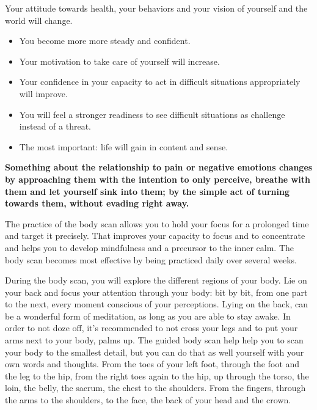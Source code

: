 \documentclass[../main.tex]{subfiles}
\begin{document}
\label{Ex:BodyScan}

Your attitude towards health,  your behaviors
and your vision of yourself and the world will change.

\begin{itemize}
\item You become more more {steady and confident}.
\item Your motivation to {take care of yourself} will increase.
\item Your confidence in your capacity to {act in difficult situations appropriately} will improve.
\item You will feel a stronger readiness to {see difficult situations as challenge} instead of a threat.
\item The most important: {life will gain in content and sense}.
\end{itemize} 

\textbf{Something about the {relationship to pain or negative emotions changes} by approaching them with the intention to {only perceive}, {breathe} with them and let yourself {sink into them};
  by the simple act of {turning towards them}, without evading right away.}

The practice of the body scan allows you to hold your {focus for a prolonged time} and target it precisely.
That improves your {capacity to focus} and to concentrate and helps you to develop mindfulness and a precursor to the {inner calm}.
The body scan becomes most effective by being practiced {daily over several weeks}.

During the body scan, you will {explore the different regions of your body}.
{Lie on your back} and focus your attention through your body: bit by bit, from one part to the next, every moment {conscious of your perceptions}.
{Lying on the back}, can be a wonderful form of meditation, as long as you are able to {stay awake}.
In order to not doze off, it's recommended to {not cross your legs} and to put your {arms next to your body, palms up}.
The guided body scan help help you to scan your body to the smallest detail, but you can do that as well yourself with {your own words and thoughts}. 
{From the toes of your left foot, through the foot and the leg to the hip, from the right toes again to the hip, up through the torso, the loin, the belly, the sacrum, the chest to the shoulders.
  From the fingers, through the arms to the shoulders, to the face, the back of your head and the crown}.
\end{document}
